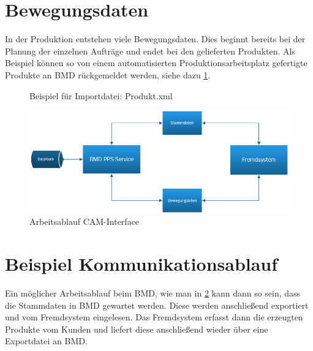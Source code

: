\section{Bewegungsdaten}
In der Produktion entstehen viele Bewegungsdaten. Dies beginnt bereits bei der Planung der einzelnen Aufträge und endet bei den gelieferten Produkten. Als Beispiel können so von einem automatisierten Produktionsarbeitsplatz gefertigte Produkte an BMD rückgemeldet werden, siehe dazu \ref{fig:ProduktImp}. 

\begin{figure}
\centering
{}
    
\caption{Beispiel für Importdatei: Produkt.xml  %
}
\label{fig:ProduktImp}
\end{figure}

\begin{figure}
    \centering
    \includegraphics[width=.95\textwidth]{images/Systemschema.png}
    \caption{Arbeitsablauf CAM-Interface}
    \label{fig:Arbeitsablauf}
\end{figure}

\section{Beispiel Kommunikationsablauf}
Ein möglicher Arbeitsablauf beim BMD, wie man in \ref{fig:Arbeitsablauf} kann dann so sein, dass die Stammdaten in BMD gewartet werden. Diese werden anschließend exportiert und vom Fremdsystem eingelesen. Das Fremdsystem erfasst dann die erzeugten Produkte vom Kunden und liefert diese anschließend wieder über eine Exportdatei an BMD. 